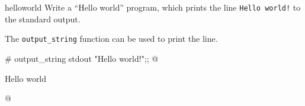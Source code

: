 %
%
%

\exercises

%
\begin{exercise}{helloworld}
Write a ``Hello world'' program, which prints the
line \hbox{\lstinline+Hello world!+} to the standard output.

\begin{answer}\ifanswers
The \hbox{\lstinline+output_string+} function can be used to print the
line.

\begin{ocaml}
# output_string stdout "Hello world!\n";;
@
\begin{topoutput}
Hello world
\end{topoutput}
@
\end{ocaml}
\fi\end{answer}
\end{exercise}

